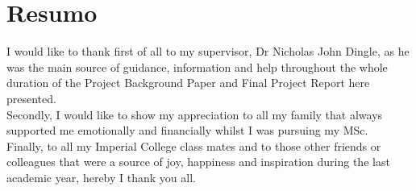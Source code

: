 \chapter*{Resumo}

I would like to thank first of all to my supervisor, Dr Nicholas John Dingle, as he was the main source of guidance, information and help throughout the whole duration of the Project Background Paper and Final Project Report here presented.\\

Secondly, I would like to show my appreciation to all my family that always supported me emotionally and financially whilst I was pursuing my MSc.\\

Finally, to all my Imperial College class mates and to those other friends or colleagues that were a source of joy, happiness and inspiration during the last academic year, hereby I thank you all.\\

